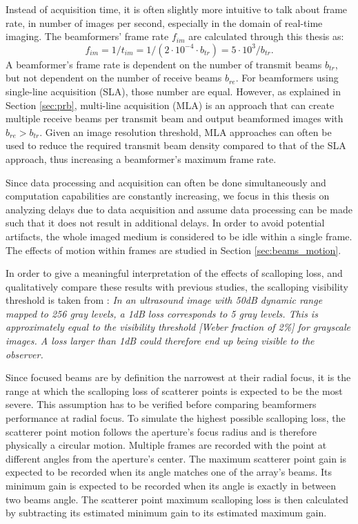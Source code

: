 Instead of acquisition time, it is often slightly more intuitive to talk about frame rate, in number of images per second, especially in the domain of real-time imaging. The beamformers' frame rate $f_{im}$ are calculated through this thesis as:
\begin{equation}
    f_{im} = 1 / t_{im} = 1 / (2 \cdot 10^{-4} \cdot b_{tr}) = 5 \cdot 10^3 / b_{tr}.
\label{eq:frame_rate}
\end{equation}
\noindent
A beamformer's frame rate is dependent on the number of transmit beams $b_{tr}$, but not dependent on the number of receive beams $b_{re}$. For beamformers using single-line acquisition (SLA), those number are equal. However, as explained in Section \ref{sec:prb}, multi-line acquisition (MLA) is an approach that can create multiple receive beams per transmit beam and output beamformed images with $b_{re} > b_{tr}$.
Given an image resolution threshold, MLA approaches can often be used to reduce the required transmit beam density compared to that of the SLA approach, thus increasing a beamformer's maximum frame rate.

Since data processing and acquisition can often be done simultaneously and computation capabilities are constantly increasing, we focus in this thesis on analyzing delays due to data acquisition and assume data processing can be made such that it does not result in additional delays.
In order to avoid potential artifacts, the whole imaged medium is considered to be idle within a single frame. The effects of motion within frames are studied in Section \ref{sec:beams_motion}.

In order to give a meaningful interpretation of the effects of scalloping loss, and qualitatively compare these results with previous studies, the scalloping visibility threshold is taken from \cite{Asen_shift_invariance}: \newline
\textit{In an ultrasound image with 50dB dynamic range mapped to 256 gray levels, a 1dB loss corresponds to 5 gray levels. This is approximately equal to the visibility threshold [Weber fraction of 2\%] for grayscale images. A loss larger than 1dB could therefore end up being visible to the observer.}

Since focused beams are by definition the narrowest at their radial focus, it is the range at which the scalloping loss of scatterer points is expected to be the most severe. This assumption has to be verified before comparing beamformers performance at radial focus.
To simulate the highest possible scalloping loss, the scatterer point motion follows the aperture's focus radius and is therefore physically a circular motion. Multiple frames are recorded with the point at different angles from the aperture's center. The maximum scatterer point gain is expected to be recorded when its angle matches one of the array's beams. Its minimum gain is expected to be recorded when its angle is exactly in between two beams angle. The scatterer point maximum scalloping loss is then calculated by subtracting its estimated minimum gain to its estimated maximum gain.


